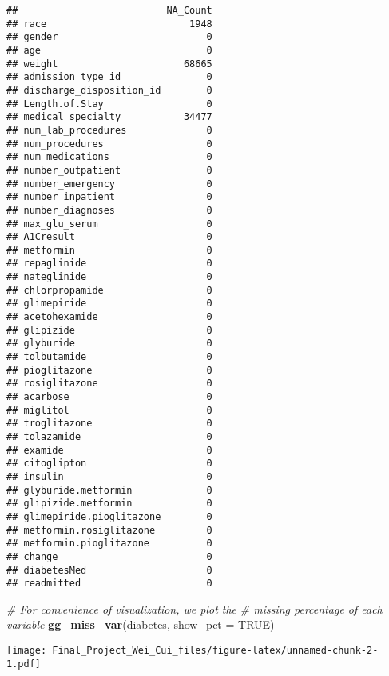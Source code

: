 \documentclass[
]{article}
\newenvironment{Shaded}{\begin{snugshade}}{\end{snugshade}}
\newcommand{\CommentTok}[1]{\textcolor[rgb]{0.56,0.35,0.01}{\textit{#1}}}
\newcommand{\DataTypeTok}[1]{\textcolor[rgb]{0.13,0.29,0.53}{#1}}
\newcommand{\KeywordTok}[1]{\textcolor[rgb]{0.13,0.29,0.53}{\textbf{#1}}}
\newcommand{\NormalTok}[1]{#1}
\newcommand{\OtherTok}[1]{\textcolor[rgb]{0.56,0.35,0.01}{#1}}
\begin{document}
\begin{verbatim}
##                          NA_Count
## race                         1948
## gender                          0
## age                             0
## weight                      68665
## admission_type_id               0
## discharge_disposition_id        0
## Length.of.Stay                  0
## medical_specialty           34477
## num_lab_procedures              0
## num_procedures                  0
## num_medications                 0
## number_outpatient               0
## number_emergency                0
## number_inpatient                0
## number_diagnoses                0
## max_glu_serum                   0
## A1Cresult                       0
## metformin                       0
## repaglinide                     0
## nateglinide                     0
## chlorpropamide                  0
## glimepiride                     0
## acetohexamide                   0
## glipizide                       0
## glyburide                       0
## tolbutamide                     0
## pioglitazone                    0
## rosiglitazone                   0
## acarbose                        0
## miglitol                        0
## troglitazone                    0
## tolazamide                      0
## examide                         0
## citoglipton                     0
## insulin                         0
## glyburide.metformin             0
## glipizide.metformin             0
## glimepiride.pioglitazone        0
## metformin.rosiglitazone         0
## metformin.pioglitazone          0
## change                          0
## diabetesMed                     0
## readmitted                      0
\end{verbatim}

\begin{Shaded}
\begin{Highlighting}[]
\CommentTok{# For convenience of visualization, we plot the }
\CommentTok{# missing percentage of each variable}
\KeywordTok{gg_miss_var}\NormalTok{(diabetes, }\DataTypeTok{show_pct =} \OtherTok{TRUE}\NormalTok{)}
\end{Highlighting}
\end{Shaded}

\texttt{[image: Final\_Project\_Wei\_Cui\_files/figure-latex/unnamed-chunk-2-1.pdf]}
\end{document}

